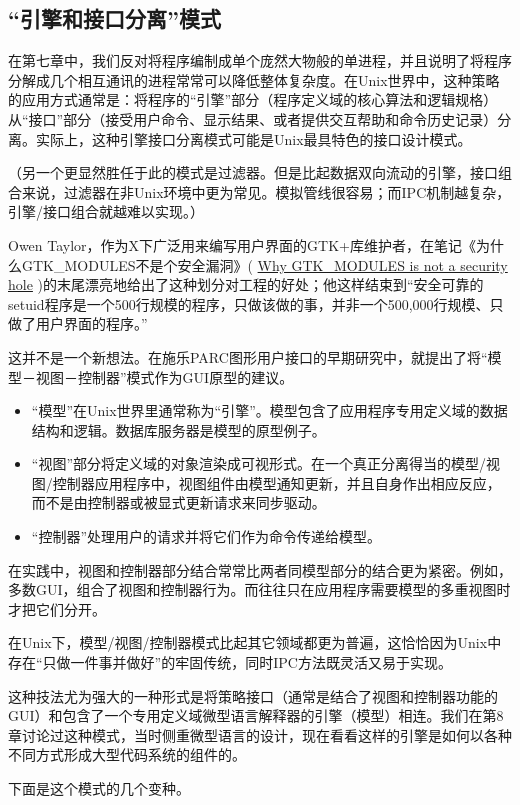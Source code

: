 \documentclass[12pt,oneside]{book}
\begin{document}
\begin{common-format}
\subsection{“引擎和接口分离”模式}
在第七章中，我们反对将程序编制成单个庞然大物般的单进程，并且说明了将程序分解成几个相互通讯的进程常常可以降低整体复杂度。在Unix世界中，这种策略的应用方式通常是：将程序的“引擎”部分（程序定义域的核心算法和逻辑规格）从“接口”部分（接受用户命令、显示结果、或者提供交互帮助和命令历史记录）分离。实际上，这种引擎接口分离模式可能是Unix最具特色的接口设计模式。

（另一个更显然胜任于此的模式是过滤器。但是比起数据双向流动的引擎，接口组合来说，过滤器在非Unix环境中更为常见。模拟管线很容易；而IPC机制越复杂，引擎/接口组合就越难以实现。）

Owen Taylor，作为X下广泛用来编写用户界面的GTK+库维护者，在笔记《为什么GTK\_{}MODULES不是个安全漏洞》( \href{http://www.gtk.org/setuid.html}{Why GTK\_{}MODULES is not a security hole} )的末尾漂亮地给出了这种划分对工程的好处；他这样结束到“安全可靠的setuid程序是一个500行规模的程序，只做该做的事，并非一个500,000行规模、只做了用户界面的程序。”

这并不是一个新想法。在施乐PARC图形用户接口的早期研究中，就提出了将“模型－视图－控制器”模式作为GUI原型的建议。
\begin{itemize}
\item “模型”在Unix世界里通常称为“引擎”。模型包含了应用程序专用定义域的数据结构和逻辑。数据库服务器是模型的原型例子。
\item “视图”部分将定义域的对象渲染成可视形式。在一个真正分离得当的模型/视图/控制器应用程序中，视图组件由模型通知更新，并且自身作出相应反应，而不是由控制器或被显式更新请求来同步驱动。
\item “控制器”处理用户的请求并将它们作为命令传递给模型。
\end{itemize}

在实践中，视图和控制器部分结合常常比两者同模型部分的结合更为紧密。例如，多数GUI，组合了视图和控制器行为。而往往只在应用程序需要模型的多重视图时才把它们分开。

在Unix下，模型/视图/控制器模式比起其它领域都更为普遍，这恰恰因为Unix中存在“只做一件事并做好”的牢固传统，同时IPC方法既灵活又易于实现。

这种技法尤为强大的一种形式是将策略接口（通常是结合了视图和控制器功能的GUI）和包含了一个专用定义域微型语言解释器的引擎（模型）相连。我们在第8章讨论过这种模式，当时侧重微型语言的设计，现在看看这样的引擎是如何以各种不同方式形成大型代码系统的组件的。

下面是这个模式的几个变种。


\end{common-format}
\end{document}

